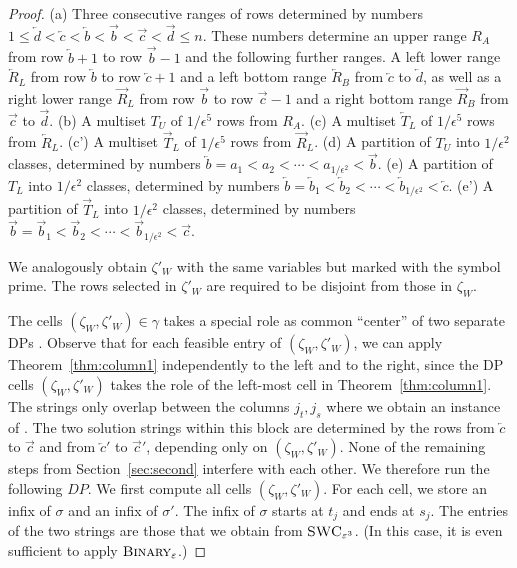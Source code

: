 \begin{proof}
    (a) Three consecutive ranges of rows determined by numbers $1\le \overleftarrow{d} < \overleftarrow{c} < \overleftarrow{b} < \overrightarrow{b} < \overrightarrow{c} < \overrightarrow{d} \le n$.
    These numbers determine an upper range $R_A$ from row $\overleftarrow{b}+1$ to row $\overrightarrow{b}-1$ and the following further ranges.
    A left lower range $\overleftarrow{R}_L$ from row $\overleftarrow{b}$ to row $\overleftarrow{c}+1$ and a left bottom range $\overleftarrow{R}_B$ from $\overleftarrow{c}$ to $\overleftarrow{d}$,
    as well as a right lower range $\overrightarrow{R}_L$ from row $\overrightarrow{b}$ to row $\overrightarrow{c}-1$ and a right bottom range $\overrightarrow{R}_B$ from $\overrightarrow{c}$ to $\overrightarrow{d}$.
    (b)  A multiset $T_U$ of $1/\epsilon^5$ rows from $R_A$. 
    (c)  A multiset $\overleftarrow{T}_L$ of $1/\epsilon^5$ rows from $\overleftarrow{R}_L$.
    (c') A multiset $\overrightarrow{T}_L$ of $1/\epsilon^5$ rows from $\overrightarrow{R}_L$.
    (d)  A partition of $T_U$ into $1/\epsilon^2$ classes, determined by numbers $\overleftarrow{b} = a_1 < a_2 < \dotsm < a_{1/\epsilon^2} < \overrightarrow{b}$.
    (e)  A partition of $T_L$ into $1/\epsilon^2$ classes, determined by numbers $\overleftarrow{b} = \overleftarrow{b}_1 < \overleftarrow{b}_2 < \dotsm < \overleftarrow{b}_{1/\epsilon^2} < \overleftarrow{c}$.
    (e') A partition of $\overrightarrow{T}_L$ into $1/\epsilon^2$ classes, determined by numbers $\overrightarrow{b} = \overrightarrow{b}_1 < \overrightarrow{b}_2 < \dotsm < \overrightarrow{b}_{1/\epsilon^2} < \overrightarrow{c}$.

    We analogously obtain $\zeta'_W$ with the same variables but marked with the symbol prime.
    The rows selected in $\zeta'_W$ are required to be disjoint from those in $\zeta_W$.

    The cells $(\zeta_W,\zeta'_W) \in \gamma$ takes a special role as common ``center'' of two separate DPs .
    Observe that for each feasible entry of $(\zeta_W,\zeta'_W)$, we can apply Theorem~\ref{thm:column1} independently to the left and to the right, since the DP cells $(\zeta_W,\zeta'_W)$ takes the role of the left-most cell in Theorem~\ref{thm:column1}.
    The strings only overlap between the columns $j_t,j_s$ where we obtain an instance of \BMEC.
    The two solution strings within this block are determined by the rows from $\overleftarrow{c}$ to $\overrightarrow{c}$ and from $\overleftarrow{c}'$ to $\overrightarrow{c}'$, depending only on $(\zeta_W,\zeta'_W)$.
    None of the remaining steps from Section~\ref{sec:second} interfere with each other.
    We therefore run the following $DP$.
    We first compute all cells $(\zeta_W,\zeta'_W)$.
    For each cell, we store an infix of $\sigma$ and an infix of $\sigma'$.
    The infix of $\sigma$ starts at $t_j$ and ends at $s_j$.
    The entries of the two strings are those that we obtain from $\SWC$. (In this case, it is even sufficient to apply $\textsc{Binary}_\epsilon$.)
    

\end{proof}
